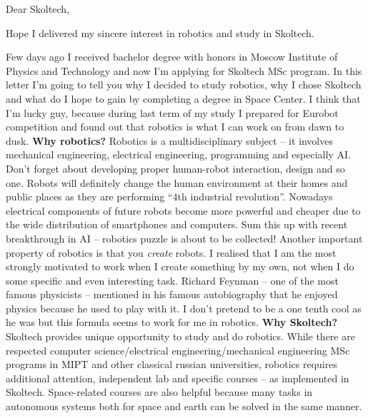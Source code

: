 \documentclass[11pt,a4paper,roman]{moderncv}        %
\begin{document}
\date{\today}
\opening{Dear Skoltech,}
\closing{Hope I delivered my sincere interest in robotics and study in Skoltech.}
\makelettertitle

Few days ago I received bachelor degree with honors in Moscow Institute of Physics and Technology and now I'm applying for Skoltech MSc program. In this letter I'm going to tell you why I decided to study robotics, why I chose Skoltech and what do I hope to gain by completing a degree in Space Center. 
\newline
\newline
I think that I'm lucky guy, because during last term of my study I prepared for Eurobot competition and found out that robotics is what I can work on from dawn to dusk.\newline
\newline
\textbf{Why robotics?} Robotics is a multidisciplinary subject -- it involves mechanical engineering, electrical engineering, programming and especially AI. Don't forget about developing proper human-robot interaction, design and so one. Robots will definitely change the human environment at their homes and public places as they are performing ``4th industrial revolution''. Nowadays electrical components of future robots become more powerful and cheaper due to the wide distribution of smartphones and computers. Sum this up with recent breakthrough in AI -- robotics puzzle is about to be collected! Another important property of robotics is that you \textit{create} robots. I realised that I am the most strongly motivated to work when I create something by my own, not when I do some specific and even interesting task. Richard Feynman -- one of the most famous physicists -- mentioned in his famous autobiography that he enjoyed physics because he used to play with it. I don't pretend to be a one tenth cool as he was but this formula seems to work for me in robotics. 
\newline
\newline
\textbf{Why Skoltech?} Skoltech provides unique opportunity to study and do robotics. While there are respected computer science/electrical engineering/mechanical engineering MSc programs in MIPT and other classical russian universities, robotics requires additional attention, independent lab and specific courses -- as implemented in Skoltech. Space-related courses are also helpful because many tasks in autonomous systems both for space and earth can be solved in the same manner. 
\end{document}
